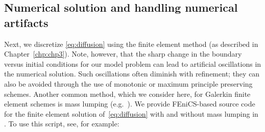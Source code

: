 \subsection{Numerical solution and handling numerical artifacts}
 Next, we discretize \eqref{eq:diffusion} using
the finite element method (as described in
Chapter~\ref{chp:chp3}). Note, however, that the sharp change in the
boundary versus initial conditions for our model problem can lead to
artificial oscillations in the numerical solution. Such oscillations
often diminish with refinement; they can also be avoided through the
use of monotonic or maximum principle preserving schemes. Another
common method, which we consider here, for Galerkin finite element
schemes is mass lumping (e.g.~\cite{langtangen2016solving}). We
provide FEniCS-based source code for the finite element solution
of~\eqref{eq:diffusion} with and without mass lumping in
. To use this script, see, for
example:
